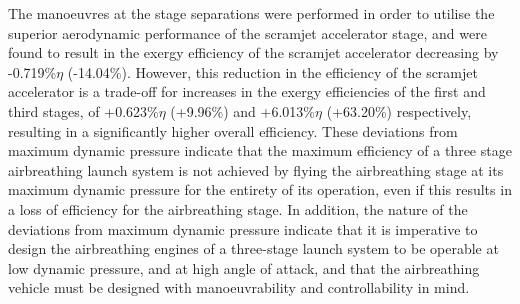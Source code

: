 The manoeuvres at the stage separations were performed in order to utilise the superior aerodynamic performance of the scramjet accelerator stage, and were found to result in the exergy efficiency of the scramjet accelerator decreasing by -0.719\%$\eta$ (-14.04\%). However, this reduction in the efficiency of the scramjet accelerator is a trade-off for increases in the exergy efficiencies of the first and third stages, of +0.623\%$\eta$ (+9.96\%) and +6.013\%$\eta$ (+63.20\%) respectively, resulting in a significantly higher overall efficiency. These deviations from maximum dynamic pressure indicate that the maximum efficiency of a three stage airbreathing launch system is not achieved by flying the airbreathing stage at its maximum dynamic pressure for the entirety of its operation, even if this results in a loss of efficiency for the airbreathing stage. In addition, the nature of the deviations from maximum dynamic pressure indicate that it is imperative to design the airbreathing engines of a three-stage launch system to be operable at low dynamic pressure, and at high angle of attack, and that the airbreathing vehicle must be designed with manoeuvrability and controllability in mind.

